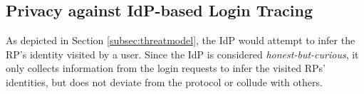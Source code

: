 




\subsection{Privacy against IdP-based Login Tracing}
\label{subsec:IdP-privacy}

As depicted in Section \ref{subsec:threatmodel}, the IdP would attempt to infer the RP's identity visited by a user. Since the IdP is considered \emph{honest-but-curious}, it only collects information from the login requests to infer the visited RPs' identities, but does not %
 deviate from the protocol or collude with others.

